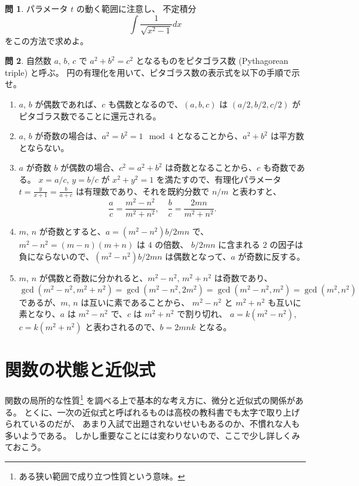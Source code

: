 \documentclass[a4paper]{jsarticle}
\theoremstyle{definition}
\newtheorem{Exercise}{問}%
\theoremstyle{remark}
\begin{document}
\begin{Exercise} 
パラメータ $t$ の動く範囲に注意し、
不定積分
\[
\int \frac{1}{\sqrt{x^2-1}} dx
\]
をこの方法で求めよ。
\end{Exercise}

\begin{Exercise}
  自然数 $a$, $b$, $c$ で $a^2 + b^2 = c^2$ となるものをピタゴラス数 (Pythagorean triple) と呼ぶ。 
  円の有理化を用いて、ピタゴラス数の表示式を以下の手順で示せ。
  \begin{enumerate}
  \item $a$, $b$ が偶数であれば、$c$ も偶数となるので、$(a,b,c)$ は $(a/2,b/2,c/2)$ がピタゴラス数でることに還元される。
  \item
    $a$, $b$ が奇数の場合は、$a^2 = b^2 = 1 \mod 4$ となることから、$a^2+ b^2$ は平方数とならない。
  \item
    $a$ が奇数 $b$ が偶数の場合、$c^2 = a^2 + b^2$ は奇数となることから、$c$ も奇数である。
    $x = a/c$, $y = b/c$ が $x^2 + y^2 = 1$ を満たすので、有理化パラメータ 
    $t = \frac{y}{x+1} = \frac{b}{a+c}$ は有理数であり、それを既約分数で $n/m$ と表わすと、
    \[
      \frac{a}{c} = \frac{m^2-n^2}{m^2+n^2},
      \quad
      \frac{b}{c} = \frac{2mn}{m^2+n^2}.
    \]
  \item
    $m$, $n$ が奇数とすると、$a = (m^2-n^2)b/2mn$ で、$m^2-n^2 = (m-n)(m+n)$ は $4$ の倍数、
    $b/2mn$ に含まれる $2$ の因子は負にならないので、$(m^2-n^2)b/2mn$ は偶数となって、$a$ が奇数に反する。
  \item
    $m$, $n$ が偶数と奇数に分かれると、$m^2 - n^2$, $m^2+n^2$ は奇数であり、
    \[
      \gcd(m^2-n^2,m^2+n^2) = \gcd(m^2-n^2,2m^2) = \gcd(m^2-n^2,m^2) = \gcd(m^2,n^2)
    \]
    であるが、$m$, $n$ は互いに素であることから、
    $m^2-n^2$ と $m^2 + n^2$ も互いに素となり、$a$ は $m^2-n^2$ で、$c$ は $m^2+n^2$ で割り切れ、
    $a = k(m^2-n^2)$, $c = k(m^2+n^2)$ と表わされるので、$b = 2mn k$ となる。
  \end{enumerate}
\end{Exercise}

\bigskip
\bigskip
\section{関数の状態と近似式}
関数の局所的な性質\footnote{ある狭い範囲で成り立つ性質という意味。}
を調べる上で基本的な考え方に、微分と近似式の関係がある。
とくに、一次の近似式と呼ばれるものは高校の教科書でも太字で取り上げられているのだが、
あまり入試で出題されないせいもあるのか、不慣れな人も多いようである。
しかし重要なことには変わりないので、ここで少し詳しくみておこう。
\end{document}
